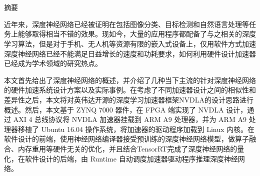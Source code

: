 \maketitle%
\chapter[摘要]{\MyTitleCh}
\setcounter{page}{1}%

\begin{center}
\vspace{-0.3cm}
 \songti 摘要
\vspace{0.3cm}
\end{center}

近年来，深度神经网络已经被证明在包括图像分类、目标检测和自然语言处理等任务上能够取得相当不错的效果。现如今，大量的应用程序都配备了与之相关的深度学习算法，但是对于手机、无人机等资源有限的嵌入式设备上，仅用软件方式加速深度神经网络已经不能满足日益增长的速度和功耗要求，如何利用硬件设计加速器已经成为学术领域的研究热点。

本文首先给出了深度神经网络的概述，并介绍了几种当下主流的针对深度神经网络的硬件加速系统设计方案以及实际事例。在考虑了不同加速器设计之间的相似性和差异性之后，本文将对英伟达开源的深度学习加速器框架NVDLA的设计思路进行概述。然后，本文基于 ZYNQ 7000 器件，在 FPGA 端实现了 NVDLA 设计，通过 AXI 4 总线协议将 NVDLA 加速器挂载到 ARM A9 处理器，并为 ARM A9 处理器移植了 Ubuntu 16.04 操作系统，将加速器的驱动程序加载到 Linux 内核。在软件设计的前端，使用神经网络编译器接受预训练的深度神经网络模型，做算子融合、内存重用等硬件无关的优化，并且结合TensorRT完成了深度神经网络的量化，在软件设计的后端，由 Runtime 自动调度加速器驱动程序推理深度神经网络。

{
}
